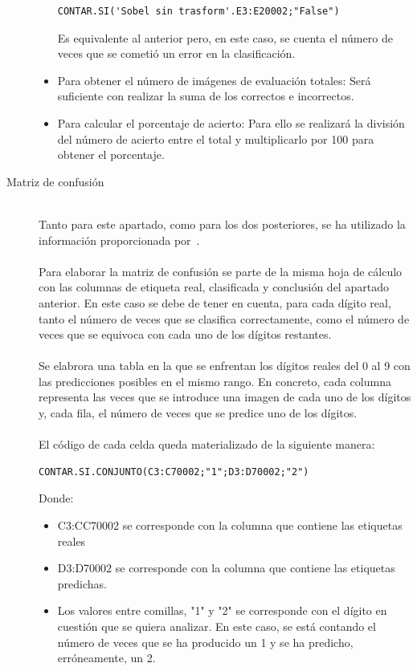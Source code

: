 \begin{description}
\begin{itemize}
{\begin{lstlisting}[frame=single]
			CONTAR.SI('Sobel sin trasform'.E3:E20002;"False")
		\end{lstlisting}
		Es equivalente al anterior pero, en este caso, se cuenta el número de veces que se cometió un error en la clasificación.
	}
	\item{Para obtener el número de imágenes de evaluación totales: Será suficiente con realizar la suma de los correctos e incorrectos.
	}
	\item{Para calcular el porcentaje de acierto: Para ello se realizará la división del número de acierto entre el total y multiplicarlo por 100 para obtener el porcentaje.
	}
	\end{itemize}
	\vspace{15pt}
	\item[Matriz de confusión] \hfill 
	\vspace{10pt}
	\\
	Tanto para este apartado, como para los dos posteriores, se ha utilizado la información proporcionada por~\cite{metrics}.\\
	\vspace{-10pt}
	\\
	Para elaborar la matriz de confusión se parte de la misma hoja de cálculo con las columnas de etiqueta real, clasificada y conclusión del apartado anterior. En este caso se debe de tener en cuenta, para cada dígito real, tanto el número de veces que se clasifica correctamente, como el número de veces que se equivoca con cada uno de los dígitos restantes.\\
	\vspace{-10pt}
	\\
	Se elabrora una tabla en la que se enfrentan los dígitos reales del 0 al 9 con las predicciones posibles en el mismo rango. En concreto, cada columna representa las veces que se introduce una imagen de cada uno de los dígitos y, cada fila, el número de veces que se predice uno de los dígitos.\\
	\vspace{20pt}
	\\
	El código de cada celda queda materializado de la siguiente manera:
	\vspace{10pt}
	\begin{lstlisting}[frame=single]
		CONTAR.SI.CONJUNTO(C3:C70002;"1";D3:D70002;"2")
	\end{lstlisting}
	Donde:
	\begin{itemize}
		\item C3:CC70002 se corresponde con la columna que contiene las etiquetas reales
		\item D3:D70002 se corresponde con la columna que contiene las etiquetas predichas.
		\item Los valores entre comillas, "1" y "2" se corresponde con el dígito en cuestión que se quiera analizar. En este caso, se está contando el número de veces que se ha producido un 1 y se ha predicho, erróneamente, un 2.
	\end{itemize}
	

\end{description}

